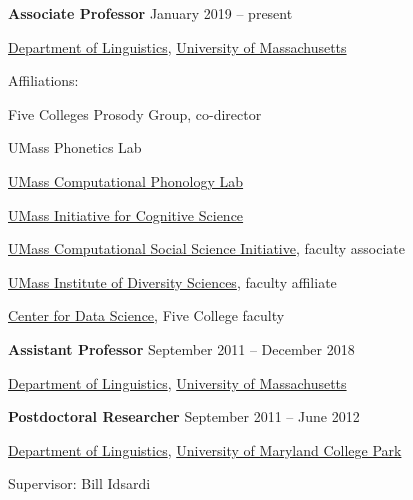 \documentclass[10pt]{article}
\newcommand{\halfblankline}{\quad\vspace{-0.5\baselineskip}\pagebreak[3]}
\begin{document}
\textbf{Associate Professor} \hfill {January 2019 -- present}
\begin{innerlist}

    \item[] \href{http://www.umass.edu/linguist}{Department of Linguistics},
            \href{http://www.umass.edu/linguist}{University of Massachusetts}
    \begin{innerlist}
        \item Affiliations:
            \begin{innerlist}[\enskip$\circ$,leftmargin=*]
                \item {Five Colleges Prosody Group}, co-director
                \item {UMass Phonetics Lab}
                \item \href{https://blogs.umass.edu/comphon/}{UMass Computational Phonology Lab}
                \item \href{https://blogs.umass.edu/cogsci/}{UMass
                    Initiative for Cognitive Science}
                \item\href{http://www.cssi.umass.edu/}{UMass
                    Computational Social Science Initiative}, faculty associate
                \item\href{https://www.umass.edu/diversitysciences/}{UMass Institute of Diversity Sciences}, faculty affiliate
                \item\href{https://ds.cs.umass.edu/}{Center for Data
                  Science}, Five College faculty
            \end{innerlist}
    \end{innerlist}

\end{innerlist}

\halfblankline

\textbf{Assistant Professor} \hfill {September 2011 -- December 2018}
\begin{innerlist}

    \item[] \href{http://www.umass.edu/linguist}{Department of Linguistics},
            \href{http://www.umass.edu/linguist}{University of Massachusetts}
    \end{innerlist}

\halfblankline

\textbf{Postdoctoral Researcher} \hfill {September 2011 -- June 2012}
\begin{innerlist}

    \item[] \href{http://ling.umd.edu/}{Department of Linguistics},
            \href{http://www.umd.edu}{University of Maryland College
              Park}
            \begin{innerlist}
        \item Supervisor: Bill Idsardi
        \end{innerlist}

\end{innerlist}
\end{document}

